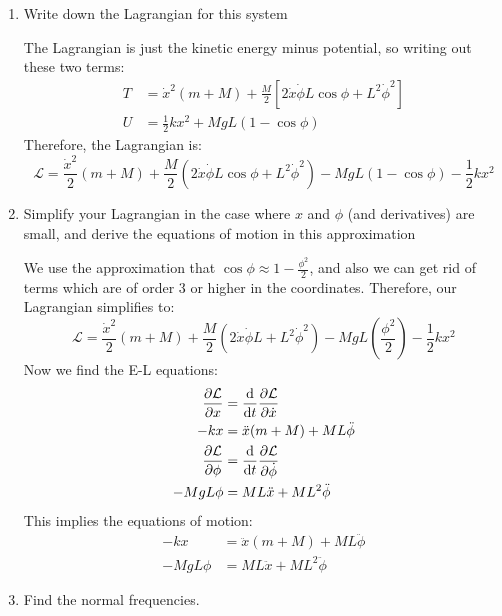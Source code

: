 \documentclass[10pt]{article}
\begin{document}
	\begin{enumerate}[label=\alph*)]
		\item Write down the Lagrangian for this system

			\begin{solution}
				The Lagrangian is just the kinetic energy minus potential, so writing out these two terms: 
				\begin{align*}
					T &= \dot x^2(m + M) + \frac{M}{2}\left[ 2 \dot x \dot \phi L \cos \phi + L^2 \dot \phi^2
					\right]\\
					U &= \frac{1}{2}kx^2 + MgL(1 - \cos \phi)
				\end{align*}
				Therefore, the Lagrangian is:
				\[
				\mathcal L = \frac{\dot x^2}{2}(m + M) + \frac{M}{2}\left( 2 \dot x \dot \phi L \cos \phi
				+ L^2 \dot \phi^2 \right) - MgL(1 - \cos \phi) - \frac{1}{2}kx^2
				\] 
			\end{solution}
		\item Simplify your Lagrangian in the case where $x$ and $\phi$ (and derivatives) are small, and derive
			the equations of motion in this approximation

			\begin{solution}
				We use the approximation that $\cos \phi \approx 1 - \frac{\phi^2}{2}$, and also we can 
				get rid of terms which are of order 3 or higher in the coordinates. Therefore, our Lagrangian 
				simplifies to: 
				\[
				\mathcal L = \frac{\dot x^2}{2}(m + M) + \frac{M}{2}\left( 2 \dot x \dot \phi L + L^2 
				\dot \phi^2\right) - MgL(\frac{\phi^2}{2}) - \frac{1}{2}kx^2
				\] 
				Now we find the E-L equations: 
				\begin{align*}
					\pdv{\mathcal L}{x} &= \dv{t} \pdv{\mathcal L}{\dot x} \\
					-kx &= \ddot x(m + M) + ML \ddot \phi \\
					\pdv{\mathcal L}{\phi} &= \dv{t}\pdv{\mathcal L}{\dot \phi} \\
					-MgL\phi &= ML \ddot x + ML^2 \ddot \phi
				\end{align*}
				This implies the equations of motion: 
				\begin{align*}
					-kx &=  \ddot x(m+ M) + ML \ddot \phi \\
					-MgL \phi &= ML \ddot x + ML^2 \ddot \phi 
				\end{align*}
			\end{solution}
		\item Find the normal frequencies.


\end{enumerate}
\end{document}
